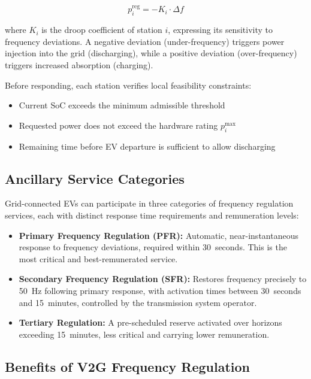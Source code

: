 \documentclass[review]{elsarticle}
\begin{document}
\begin{equation}
    p_i^{\text{reg}} = -K_i \cdot \Delta f
\end{equation}

where $K_i$ is the droop coefficient of station $i$, expressing its 
sensitivity to frequency deviations. A negative deviation (under-frequency) 
triggers power injection into the grid (discharging), while a positive 
deviation (over-frequency) triggers increased absorption (charging).

Before responding, each station verifies local feasibility constraints:

\begin{itemize}
    \item Current SoC exceeds the minimum admissible threshold
    \item Requested power does not exceed the hardware rating $p_i^{\max}$
    \item Remaining time before EV departure is sufficient to allow discharging
\end{itemize}

\subsection{Ancillary Service Categories}

Grid-connected EVs can participate in three categories of frequency 
regulation services, each with distinct response time requirements 
and remuneration levels:

\begin{itemize}
    \item \textbf{Primary Frequency Regulation (PFR):} Automatic, 
    near-instantaneous response to frequency deviations, required within 
    30~seconds. This is the most critical and best-remunerated service.

    \item \textbf{Secondary Frequency Regulation (SFR):} Restores frequency 
    precisely to 50~Hz following primary response, with activation times 
    between 30~seconds and 15~minutes, controlled by the transmission 
    system operator.

    \item \textbf{Tertiary Regulation:} A pre-scheduled reserve activated 
    over horizons exceeding 15~minutes, less critical and carrying lower 
    remuneration.
\end{itemize}

\subsection{Benefits of V2G Frequency Regulation}
\end{document}
